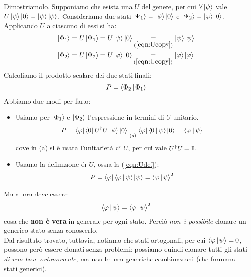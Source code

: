 \documentclass[../../InformazioneQuantistica.tex]{subfiles}
\begin{document}
Dimostriamolo. Supponiamo che esista una $U$ del genere, per cui $\forall \Ket{\psi}$ vale $U\Ket{\psi}\Ket{0} = \Ket{\psi}\Ket{\psi}$. Consideriamo due stati $\Ket{\Psi_1}=\Ket{\psi}\Ket{0}$ e $\Ket{\Psi_2}=\Ket{\varphi}\Ket{0}$. Applicando $U$ a ciascuno di essi si ha:
\begin{align}
\Ket{\Phi_1} &= U\Ket{\Psi_1}=
U\Ket{\psi}\Ket{0} \underset{(\ref{eqn:Ucopy})}{=} \Ket{\psi}\Ket{\psi} \nonumber\\
\Ket{\Phi_2} &= U\Ket{\Psi_2} =
U\Ket{\varphi}\Ket{0}  \underset{(\ref{eqn:Ucopy})}{=} \Ket{\varphi}\Ket{\varphi}
\label{eqn:Udef}
\end{align}
Calcoliamo il prodotto scalare dei due stati finali:
\begin{align*}
P = \Braket{\Phi_2|\Phi_1}
\end{align*}
Abbiamo due modi per farlo:
\begin{itemize}
\item Usiamo per $\Ket{\Phi_1}$ e $\Ket{\Phi_2}$ l'espressione in termini di $U$ unitario.
\begin{align*}
P = \Bra{\varphi}\Bra{0}U^\dag U \Ket{\psi}\Ket{0} \underset{(a)}{=} \Bra{\varphi}\Braket{0|\psi}\Ket{0} = \Braket{\varphi|\psi}
\end{align*}
dove in (a) si è usata l'unitarietà di $U$, per cui vale $U^\dag U = \mathbb{I}$.

\item Usiamo la definizione di $U$, ossia la (\ref{eqn:Udef}):
\begin{align*}
P = \Bra{\varphi}\Braket{\varphi|\psi}\Ket{\psi} = \Braket{\varphi|\psi}^2
\end{align*}
\end{itemize}
Ma allora deve essere:
\begin{align*}
\Braket{\varphi|\psi} = \Braket{\varphi|\psi}^2
\end{align*}
cosa che \textbf{non è vera} in generale per ogni stato. Perciò \textit{non è possibile} clonare un generico stato senza conoscerlo.\\
Dal risultato trovato, tuttavia, notiamo che stati ortogonali, per cui $\Braket{\varphi|\psi}=0$, possono però essere clonati senza problemi: possiamo quindi clonare tutti gli stati \textit{di una base ortonormale}, ma non le loro generiche combinazioni (che formano stati generici).
\end{document}

